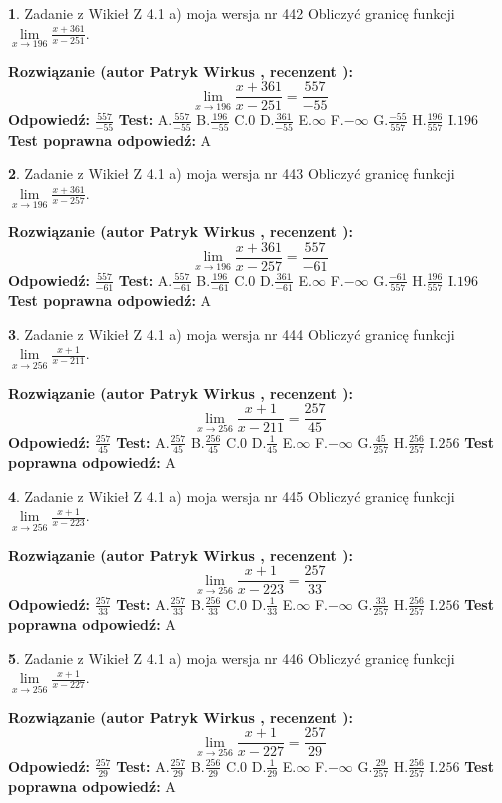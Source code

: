 \documentclass[12pt, a4paper]{article}
\theoremstyle{definition} %
\newtheorem{zad}{}
\newcommand{\zadStart}[1]{\begin{zad}#1\newline}
\newcommand{\zadStop}{\end{zad}}
\newcommand{\rozwStart}[2]{\noindent \textbf{Rozwiązanie (autor #1 , recenzent #2): }\newline}
\newcommand{\rozwStop}{\newline}
\newcommand{\odpStart}{\noindent \textbf{Odpowiedź:}\newline}
\newcommand{\odpStop}{\newline}
\newcommand{\testStart}{\noindent \textbf{Test:}\newline}
\newcommand{\testStop}{\newline}
\newcommand{\kluczStart}{\noindent \textbf{Test poprawna odpowiedź:}\newline}
\newcommand{\kluczStop}{\newline}
\begin{document}
\zadStart{Zadanie z Wikieł Z 4.1 a) moja wersja nr 442}
Obliczyć granicę funkcji $\lim\limits_{x\to196}\frac{x+361}{x-251}$.
\zadStop
\rozwStart{Patryk Wirkus}{}
$$\lim\limits_{x\to196}\frac{x+361}{x-251} = \frac{557}{-55}$$
\rozwStop
\odpStart
$\frac{557}{-55}$
\odpStop
\testStart
A.$\frac{557}{-55}$
B.$\frac{196}{-55}$
C.$0$
D.$\frac{361}{-55}$
E.$\infty$
F.$-\infty$
G.$\frac{-55}{557}$
H.$\frac{196}{557}$
I.$196$
\testStop
\kluczStart
A
\kluczStop



\zadStart{Zadanie z Wikieł Z 4.1 a) moja wersja nr 443}
Obliczyć granicę funkcji $\lim\limits_{x\to196}\frac{x+361}{x-257}$.
\zadStop
\rozwStart{Patryk Wirkus}{}
$$\lim\limits_{x\to196}\frac{x+361}{x-257} = \frac{557}{-61}$$
\rozwStop
\odpStart
$\frac{557}{-61}$
\odpStop
\testStart
A.$\frac{557}{-61}$
B.$\frac{196}{-61}$
C.$0$
D.$\frac{361}{-61}$
E.$\infty$
F.$-\infty$
G.$\frac{-61}{557}$
H.$\frac{196}{557}$
I.$196$
\testStop
\kluczStart
A
\kluczStop



\zadStart{Zadanie z Wikieł Z 4.1 a) moja wersja nr 444}
Obliczyć granicę funkcji $\lim\limits_{x\to256}\frac{x+1}{x-211}$.
\zadStop
\rozwStart{Patryk Wirkus}{}
$$\lim\limits_{x\to256}\frac{x+1}{x-211} = \frac{257}{45}$$
\rozwStop
\odpStart
$\frac{257}{45}$
\odpStop
\testStart
A.$\frac{257}{45}$
B.$\frac{256}{45}$
C.$0$
D.$\frac{1}{45}$
E.$\infty$
F.$-\infty$
G.$\frac{45}{257}$
H.$\frac{256}{257}$
I.$256$
\testStop
\kluczStart
A
\kluczStop



\zadStart{Zadanie z Wikieł Z 4.1 a) moja wersja nr 445}
Obliczyć granicę funkcji $\lim\limits_{x\to256}\frac{x+1}{x-223}$.
\zadStop
\rozwStart{Patryk Wirkus}{}
$$\lim\limits_{x\to256}\frac{x+1}{x-223} = \frac{257}{33}$$
\rozwStop
\odpStart
$\frac{257}{33}$
\odpStop
\testStart
A.$\frac{257}{33}$
B.$\frac{256}{33}$
C.$0$
D.$\frac{1}{33}$
E.$\infty$
F.$-\infty$
G.$\frac{33}{257}$
H.$\frac{256}{257}$
I.$256$
\testStop
\kluczStart
A
\kluczStop



\zadStart{Zadanie z Wikieł Z 4.1 a) moja wersja nr 446}
Obliczyć granicę funkcji $\lim\limits_{x\to256}\frac{x+1}{x-227}$.
\zadStop
\rozwStart{Patryk Wirkus}{}
$$\lim\limits_{x\to256}\frac{x+1}{x-227} = \frac{257}{29}$$
\rozwStop
\odpStart
$\frac{257}{29}$
\odpStop
\testStart
A.$\frac{257}{29}$
B.$\frac{256}{29}$
C.$0$
D.$\frac{1}{29}$
E.$\infty$
F.$-\infty$
G.$\frac{29}{257}$
H.$\frac{256}{257}$
I.$256$
\testStop
\kluczStart
A
\kluczStop
\end{document}
